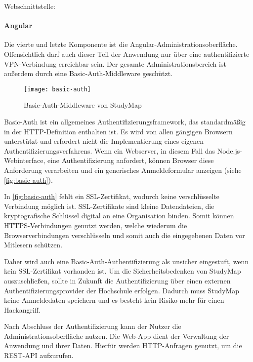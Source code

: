 \noindent
Webschnittstelle: 

\paragraph*{Angular}\label{paragraph:angular-basic-auth}
Die vierte und letzte Komponente ist die Angular-Administrationsoberfläche. Offensichtlich darf auch dieser Teil der Anwendung nur über eine authentifizierte VPN-Verbindung erreichbar sein. Der gesamte Administrationsbereich ist außerdem durch eine Basic-Auth-Middleware geschützt.

\begin{figure}[H]
    \centering
    \texttt{[image: basic-auth]}
    \caption{Basic-Auth-Middleware von StudyMap}
    \label{fig:basic-auth}
\end{figure}

Basic-Auth ist ein allgemeines Authentifizierungsframework, das standardmäßig in der HTTP-Definition enthalten ist. \parencite{mozilla_corporation_http_2023} Es wird von allen gängigen Browsern unterstützt und erfordert nicht die Implementierung eines eigenen Authentifizierungsverfahrens. \parencite{fyrd_headers_2024} Wenn ein Webserver, in diesem Fall das Node.js-Webinterface, eine Authentifizierung anfordert, können Browser diese Anforderung verarbeiten und ein generisches Anmeldeformular anzeigen (siehe \autoref{fig:basic-auth}).

In \autoref{fig:basic-auth} fehlt ein SSL-Zertifikat, wodurch keine verschlüsselte Verbindung möglich ist. SSL-Zertifikate sind kleine Datendateien, die kryptografische Schlüssel digital an eine Organisation binden. Somit können HTTPS-Verbindungen genutzt werden, welche wiederum die Browserverbindungen verschlüsseln und somit auch die eingegebenen Daten vor Mitlesern schützen. \parencite{globalsign_was_2023}

Daher wird auch eine Basic-Auth-Authentifizierung als unsicher eingestuft, wenn kein SSL-Zertifikat vorhanden ist. Um die Sicherheitsbedenken von StudyMap auszuschließen, sollte in Zukunft die Authentifizierung über einen externen Authentifizierungsprovider der Hochschule erfolgen. Dadurch muss StudyMap keine Anmeldedaten speichern und es besteht kein Risiko mehr für einen Hackangriff.

Nach Abschluss der Authentifizierung kann der Nutzer die Administrationsoberfläche nutzen. Die Web-App dient der Verwaltung der Anwendung und ihrer Daten. Hierfür werden HTTP-Anfragen genutzt, um die REST-API aufzurufen.

